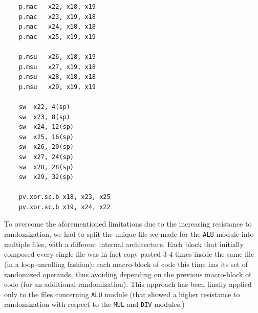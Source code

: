 \documentclass{article}
\begin{document}

\begin{verbatim}
    p.mac   x22, x18, x19
    p.mac   x23, x19, x18
    p.mac   x24, x18, x18
    p.mac   x25, x19, x19

    p.msu   x26, x18, x19
    p.msu   x27, x19, x18
    p.msu   x28, x18, x18
    p.msu   x29, x19, x19

    sw  x22, 4(sp)
    sw  x23, 8(sp)
    sw  x24, 12(sp)
    sw  x25, 16(sp)
    sw  x26, 20(sp)
    sw  x27, 24(sp)
    sw  x28, 28(sp)
    sw  x29, 32(sp)

    pv.xor.sc.b x18, x23, x25
    pv.xor.sc.b x19, x24, x22
\end{verbatim}

To overcome the aforementioned limitations due to the increasing resistance to randomization, we had to split the unique file we made for the \texttt{ALU} module into multiple files, with a different internal architecture. Each block that initially composed every single file was in fact copy-pasted 3-4 times inside the same file (in a loop-unrolling fashion): each macro-block of code this time has its set of randomized operands, thus avoiding depending on the previous macro-block of code (for an additional randomization).
This approach has been finally applied only to the files concerning \texttt{ALU} module (that showed a higher resistance to randomization with respect to the \texttt{MUL} and \texttt{DIV} modules.)
\end{document}
